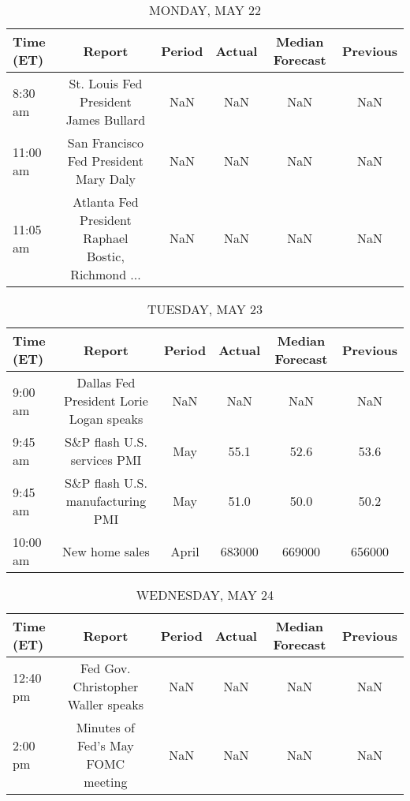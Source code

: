 \documentclass{article}%
\begin{document}
%
\normalsize%


\begin{table}[htbp]%
\caption{MONDAY, MAY 22}%
\centering%
\begin{adjustbox}{width=1\textwidth}%
\begin{tabular}{lccccc}
\toprule
Time (ET) &                                             Report & Period & Actual & Median Forecast & Previous \\
\midrule
  8:30 am &              St. Louis Fed President James Bullard &    NaN &    NaN &             NaN &      NaN \\
 11:00 am &              San Francisco Fed President Mary Daly &    NaN &    NaN &             NaN &      NaN \\
 11:05 am & Atlanta Fed President Raphael Bostic, Richmond ... &    NaN &    NaN &             NaN &      NaN \\
\bottomrule
\end{tabular}
%
\end{adjustbox}%
\end{table}

%


\begin{table}[htbp]%
\caption{TUESDAY, MAY 23}%
\centering%
\begin{adjustbox}{width=1\textwidth}%
\begin{tabular}{lccccc}
\toprule
Time (ET) &                                  Report & Period & Actual & Median Forecast & Previous \\
\midrule
  9:00 am & Dallas Fed President Lorie Logan speaks &    NaN &    NaN &             NaN &      NaN \\
  9:45 am &             S\&P flash U.S. services PMI &    May &   55.1 &            52.6 &     53.6 \\
  9:45 am &        S\&P flash U.S. manufacturing PMI &    May &   51.0 &            50.0 &     50.2 \\
 10:00 am &                          New home sales &  April & 683000 &          669000 &   656000 \\
\bottomrule
\end{tabular}
%
\end{adjustbox}%
\end{table}

%


\begin{table}[htbp]%
\caption{WEDNESDAY, MAY 24}%
\centering%
\begin{adjustbox}{width=1\textwidth}%
\begin{tabular}{lccccc}
\toprule
Time (ET) &                             Report & Period & Actual & Median Forecast & Previous \\
\midrule
 12:40 pm & Fed Gov. Christopher Waller speaks &    NaN &    NaN &             NaN &      NaN \\
  2:00 pm &  Minutes of Fed's May FOMC meeting &    NaN &    NaN &             NaN &      NaN \\
\bottomrule
\end{tabular}
%
\end{adjustbox}%
\end{table}
\end{document}
